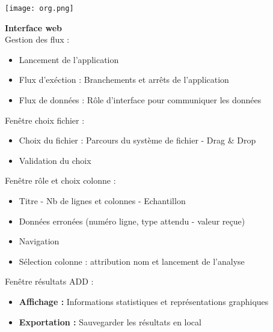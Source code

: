 	\begin{frame}
		\begin{center}\texttt{[image: org.png]}\end{center}
	\end{frame}
	
	\begin{frame}
		\textbf{Interface web}\\
		Gestion des flux :
		\begin{itemize}
			\item Lancement de l'application
			\item Flux d'exéction : Branchements et arrêts de l'application
			\item Flux de données : Rôle d'interface pour communiquer les données
		\end{itemize} \pause
		
		Fenêtre choix fichier :
		\begin{itemize}
			\item Choix du fichier : Parcours du système de fichier - Drag \& Drop
			\item Validation du choix
		\end{itemize} \pause
		
		Fenêtre rôle et choix colonne :
		\begin{itemize}
			\item Titre - Nb de lignes et colonnes - Echantillon
			\item Données erronées (numéro ligne, type attendu - valeur reçue)
			\item Navigation
			\item Sélection colonne : attribution nom et lancement de l'analyse
		\end{itemize} \pause
		
		Fenêtre résultats ADD :
		\begin{itemize}
			\item \textbf{Affichage :} Informations statistiques et représentations graphiques
			\item \textbf{Exportation :} Sauvegarder les résultats en local
		\end{itemize}
	\end{frame}
	
